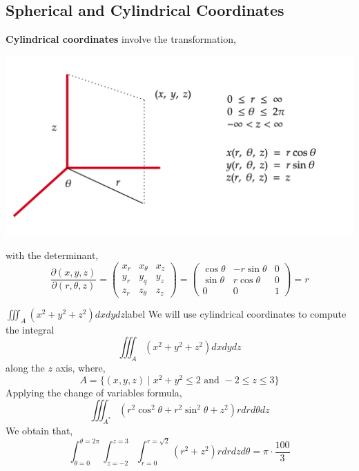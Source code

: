 \subsection{Spherical and Cylindrical Coordinates}
\noindent \textbf{Cylindrical coordinates} involve the transformation,
\begin{center}
    \includegraphics[width=0.7\linewidth]{figures/wk-6/fig-11.png}
\end{center}
with the determinant,
\[\frac{\partial(x, y, z)}{\partial(r, \theta, z)}=\left(\begin{array}{lll}
x_r & x_\theta & x_z \\
y_r & y_q & y_z \\
z_r & z_\theta & z_z
\end{array}\right) =\left(\begin{array}{ccc}
\cos \theta & -r \sin \theta & 0 \\
\sin \theta & r \cos \theta & 0 \\
0 & 0 & 1
\end{array}\right) = r\]

\begin{ex}{$\iiint_A\left(x^2+y^2+z^2\right) d x d y d z$}{label}
    We will use cylindrical coordinates to compute the integral
    \[\iiint_A\left(x^2+y^2+z^2\right) d x d y d z\]
    along the $z$ axis, where,
    \[A = \{(x, y, z) \mid x^2+y^2 \leq 2 \text{ and } -2 \leq z \leq 3\}\]
    Applying the change of variables formula,
    \[\iiint_{A^*} (r^2 \cos^2 \theta + r^2 \sin^2 \theta + z^2) r dr d\theta dz\]
    We obtain that,
    \[\int_{\theta = 0}^{\theta = 2 \pi} \int_{z = -2}^{z = 3} \int_{r = 0}^{r = \sqrt{2}} (r^2 + z^2) r dr dz d \theta = \pi \cdot \frac{100}{3}\]
\end{ex}

